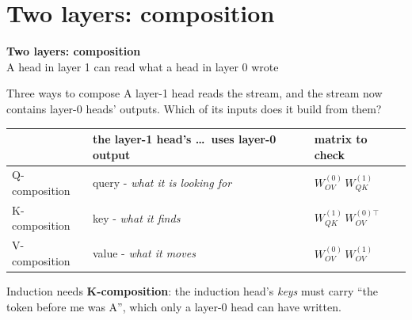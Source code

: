 \documentclass[aspectratio=169]{beamer}
\newcommand{\keybox}[1]{%
  \begin{tcolorbox}[colback=armblue!8, colframe=armblue, boxrule=0.6pt, arc=2pt]
  #1
  \end{tcolorbox}}
\newcommand{\sectiontransition}[2]{%
  \begin{frame}[plain]
    \vfill
    \begin{center}
      {\Huge\bfseries\color{popblue} #1}\\[1.1em]
      {\large #2}
    \end{center}
    \vfill
  \end{frame}}
\begin{document}
\section{Two layers: composition}
\sectiontransition{Two layers: composition}{A head in layer 1 can read what a head in layer 0 wrote}

\begin{frame}{Three ways to compose}
  \vspace{0.3em}
  A layer-1 head reads the stream, and the stream now contains layer-0 heads' outputs. Which of
  its inputs does it build from them?

  \vspace{0.5em}
  \begin{center}
  \small
  \begin{tabular}{@{}p{}p{}p{}@{}}
    \toprule
    & \textbf{the layer-1 head's \ldots\ uses layer-0 output} & \textbf{matrix to check}\\
    \midrule
    Q-composition & query - \emph{what it is looking for} & $W_{OV}^{(0)}\, W_{QK}^{(1)}$\\[0.3em]
    K-composition & key - \emph{what it finds} & $W_{QK}^{(1)}\, W_{OV}^{(0)\top}$\\[0.3em]
    V-composition & value - \emph{what it moves} & $W_{OV}^{(0)}\, W_{OV}^{(1)}$\\
    \bottomrule
  \end{tabular}
  \end{center}

  \vspace{0.5em}
  \keybox{\small Induction needs \textbf{K-composition}: the induction head's \emph{keys} must carry
  ``the token before me was A'', which only a layer-0 head can have written.}
\end{frame}
\end{document}
